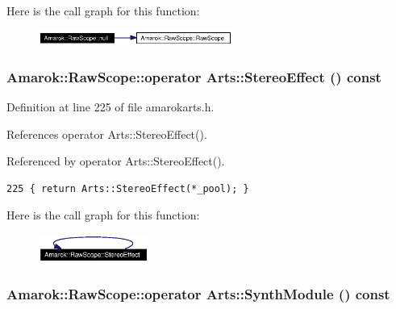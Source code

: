 Here is the call graph for this function:\begin{figure}[H]
\begin{center}
\leavevmode
\includegraphics[width=180pt]{classAmarok_1_1RawScope_Amarok_1_1RawScopee0_cgraph}
\end{center}
\end{figure}
\subsubsection{\setlength{\rightskip}{0pt plus 5cm}Amarok::Raw\-Scope::operator Arts::Stereo\-Effect () const\hspace{0.3cm}{\tt  [inline]}}\label{classAmarok_1_1RawScope_Amarok_1_1RawScopea7}




Definition at line 225 of file amarokarts.h.

References operator Arts::Stereo\-Effect().

Referenced by operator Arts::Stereo\-Effect().



\footnotesize\begin{verbatim}225 { return Arts::StereoEffect(*_pool); }
\end{verbatim}\normalsize 


Here is the call graph for this function:\begin{figure}[H]
\begin{center}
\leavevmode
\includegraphics[width=102pt]{classAmarok_1_1RawScope_Amarok_1_1RawScopea7_cgraph}
\end{center}
\end{figure}
\subsubsection{\setlength{\rightskip}{0pt plus 5cm}Amarok::Raw\-Scope::operator Arts::Synth\-Module () const\hspace{0.3cm}{\tt  [inline]}}\label{classAmarok_1_1RawScope_Amarok_1_1RawScopea8}




